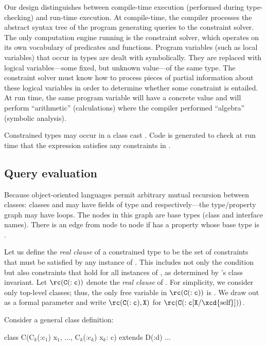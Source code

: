 Our design distinguishes between compile-time execution (performed
during type-checking) and run-time execution. At compile-time, the
compiler processes the abstract syntax tree of the program generating
queries to the constraint solver. The only computation engine running
is the constraint solver, which operates on its own vocabulary of
predicates and functions. Program variables (such as local variables)
that occur in types are dealt with symbolically. They are replaced
with logical variables---some fixed, but unknown value---of the same
type. The constraint solver must know how to process pieces of partial
information about these logical variables in order to determine
whether some constraint is entailed. At run time, the same program
variable will have a concrete value and will perform ``arithmetic''
(calculations) where the compiler performed ``algebra'' (symbolic
analysis).

Constrained types may occur in a class cast \;.  Code is
generated to check at run time that the expression 
satisfies any constraints in .

\subsection{Query evaluation}

Because object-oriented languages permit arbitrary mutual recursion between
classes: classes  and  may have fields of type  and
 respectively---the type/property graph may have loops. The nodes
in this graph are base types (class and interface names). There is an
edge from node  to node  if  has a property whose
base type is .

Let us define the {\em real clause} of a constrained type  to be
the set of constraints that must be satisfied by any instance of
. This includes not only the condition  but also
constraints that hold for all instances of , as
determined by 's class invariant. Let 
$\rc({\tt C(:c)})$ denote the {\em real clause} of .
For simplicity, we consider only top-level classes; thus, the
only free variable
in $\rc({\tt C(:c)})$ is .  We draw out  as a
formal parameter and write $\rc({\tt C(:c)}, {\tt X})$
for $\rc({\tt C(:c}[{\tt X}/\mbox{\xcd{self}}]))$.

Consider a general class definition:
\begin{displayxten}
class C(C$_k$(:c$_1$) x$_1$, ..., C$_k$(:c$_k$) x$_k$: c) extends D(:d) { ... }
\end{displayxten}

